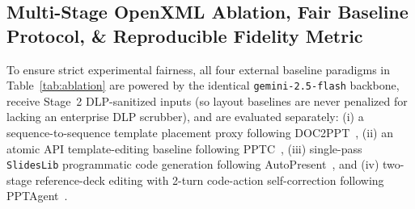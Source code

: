 \documentclass[10pt,journal,compsoc]{IEEEtran}
\begin{document}
\subsection{Multi-Stage OpenXML Ablation, Fair Baseline Protocol, \& Reproducible Fidelity Metric}
To ensure strict experimental fairness, all four external baseline paradigms in Table~\ref{tab:ablation} are powered by the identical \texttt{gemini-2.5-flash} backbone, receive Stage~2 DLP-sanitized inputs (so layout baselines are never penalized for lacking an enterprise DLP scrubber), and are evaluated separately: (i) a sequence-to-sequence template placement proxy following DOC2PPT~\cite{fu2022doc2ppt}, (ii) an atomic API template-editing baseline following PPTC~\cite{guo2024pptc}, (iii) single-pass \texttt{SlidesLib} programmatic code generation following AutoPresent~\cite{ge2025autopresent}, and (iv) two-stage reference-deck editing with 2-turn code-action self-correction following PPTAgent~\cite{zheng2025pptagent}.
\end{document}
